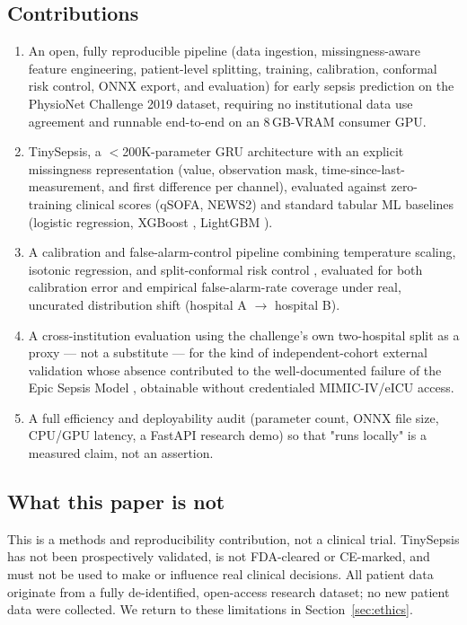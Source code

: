 \documentclass[11pt]{article}
\begin{document}
\subsection{Contributions}
\begin{enumerate}[leftmargin=*]
    \item An open, fully reproducible pipeline (data ingestion, missingness-aware feature engineering, patient-level splitting, training, calibration, conformal risk control, ONNX export, and evaluation) for early sepsis prediction on the PhysioNet Challenge 2019 dataset, requiring no institutional data use agreement and runnable end-to-end on an 8\,GB-VRAM consumer GPU.
    \item TinySepsis, a $<$200K-parameter GRU architecture with an explicit missingness representation (value, observation mask, time-since-last-measurement, and first difference per channel), evaluated against zero-training clinical scores (qSOFA, NEWS2) and standard tabular ML baselines (logistic regression, XGBoost \citep{chen2016xgboost}, LightGBM \citep{ke2017lightgbm}).
    \item A calibration and false-alarm-control pipeline combining temperature scaling, isotonic regression, and split-conformal risk control \citep{angelopoulos2022conformal}, evaluated for both calibration error and empirical false-alarm-rate coverage under real, uncurated distribution shift (hospital A $\to$ hospital B).
    \item A cross-institution evaluation using the challenge's own two-hospital split as a proxy --- not a substitute --- for the kind of independent-cohort external validation whose absence contributed to the well-documented failure of the Epic Sepsis Model \citep{wong2021external}, obtainable without credentialed MIMIC-IV/eICU access.
    \item A full efficiency and deployability audit (parameter count, ONNX file size, CPU/GPU latency, a FastAPI research demo) so that "runs locally" is a measured claim, not an assertion.
\end{enumerate}

\subsection{What this paper is not}
This is a methods and reproducibility contribution, not a clinical trial. TinySepsis has not been prospectively validated, is not FDA-cleared or CE-marked, and must not be used to make or influence real clinical decisions. All patient data originate from a fully de-identified, open-access research dataset; no new patient data were collected. We return to these limitations in Section~\ref{sec:ethics}.
\end{document}

